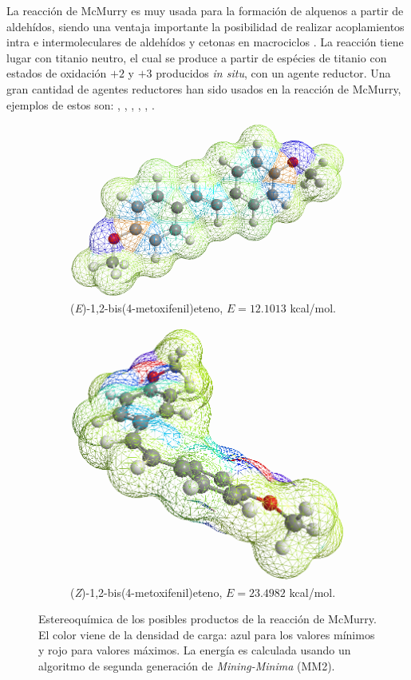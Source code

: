 \documentclass[fleqn,11pt]{SelfArx}
\begin{document}
La reacci\'on de McMurry es muy usada para la formaci\'on de alquenos a partir de aldeh\'idos, siendo una ventaja importante la posibilidad de realizar acoplamientos intra e intermoleculares de aldeh\'idos y cetonas en macrociclos \cite{Wang2010, Villiers1997}. La reacci\'on tiene lugar con titanio neutro, el cual se produce a partir de esp\'ecies de titanio con estados de oxidaci\'on $+2$ y $+3$ producidos \textit{in situ}, con un agente reductor. Una gran cantidad de agentes reductores han sido usados en la reacci\'on de McMurry, ejemplos de estos son: , , , , ,  \cite{Wang2010}.

\begin{figure}[ht]
	\centering
	\begin{subfigure}[t]{0.49\linewidth}
		\centering
		\includegraphics[width=0.9\linewidth]{structures/productE.png}
		\caption{(\textit{E})-1,2-bis(4-metoxifenil)eteno, $E=12.1013$ kcal/mol.}
	\end{subfigure}
	\begin{subfigure}[t]{0.49\linewidth}
		\centering
		\includegraphics[width=0.7\linewidth]{structures/productZ.png}
		\caption{(\textit{Z})-1,2-bis(4-metoxifenil)eteno, $E=23.4982$ kcal/mol.}
	\end{subfigure}
	\caption{Estereoqu\'imica de los posibles productos de la reacci\'on de McMurry. El color viene de la densidad de carga: azul para los valores m\'inimos y rojo para valores m\'aximos. La energ\'ia es calculada usando un algoritmo de segunda generaci\'on de \textit{Mining-Minima} (MM2)\cite{Huang2012}.}
	\label{fig: both}
\end{figure}
\end{document}
